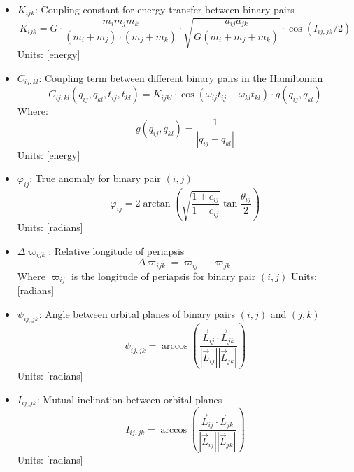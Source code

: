 \documentclass{article}
\begin{document}
\begin{itemize}
\item $K_{ijk}$: Coupling constant for energy transfer between binary pairs
    \begin{equation}
    K_{ijk} = G \cdot \frac{m_i m_j m_k}{(m_i+m_j) \cdot (m_j+m_k)} \cdot \sqrt{\frac{a_{ij} a_{jk}}{G(m_i+m_j+m_k)}} \cdot \cos(I_{ij,jk}/2)
    \end{equation}
    Units: [energy]
    
\item $C_{ij,kl}$: Coupling term between different binary pairs in the Hamiltonian
    \begin{equation}
    C_{ij,kl}(q_{ij},q_{kl},t_{ij},t_{kl}) = K_{ijkl} \cdot \cos(\omega_{ij}t_{ij} - \omega_{kl}t_{kl}) \cdot g(q_{ij},q_{kl})
    \end{equation}
    Where:
    \begin{equation}
    g(q_{ij},q_{kl}) = \frac{1}{|q_{ij} - q_{kl}|}
    \end{equation}
    Units: [energy]
    
\item $\varphi_{ij}$: True anomaly for binary pair $(i,j)$
    \begin{equation}
    \varphi_{ij} = 2 \arctan\left(\sqrt{\frac{1+e_{ij}}{1-e_{ij}}}\tan\frac{\theta_{ij}}{2}\right)
    \end{equation}
    Units: [radians]
    
\item $\Delta\varpi_{ijk}$: Relative longitude of periapsis
    \begin{equation}
    \Delta\varpi_{ijk} = \varpi_{ij} - \varpi_{jk}
    \end{equation}
    Where $\varpi_{ij}$ is the longitude of periapsis for binary pair $(i,j)$
    Units: [radians]
    
\item $\psi_{ij,jk}$: Angle between orbital planes of binary pairs $(i,j)$ and $(j,k)$
    \begin{equation}
    \psi_{ij,jk} = \arccos\left(\frac{\vec{L}_{ij} \cdot \vec{L}_{jk}}{|\vec{L}_{ij}||\vec{L}_{jk}|}\right)
    \end{equation}
    Units: [radians]
    
\item $I_{ij,jk}$: Mutual inclination between orbital planes
    \begin{equation}
    I_{ij,jk} = \arccos\left(\frac{\vec{L}_{ij} \cdot \vec{L}_{jk}}{|\vec{L}_{ij}||\vec{L}_{jk}|}\right)
    \end{equation}
    Units: [radians]
    

\end{itemize}
\end{document}
